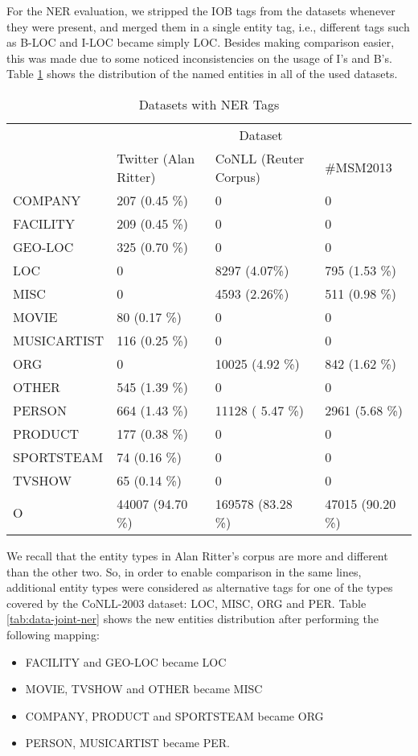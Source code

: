 For the NER evaluation, we stripped the IOB tags from the datasets whenever they were present, and merged them in a single entity tag, i.e., different tags such as B-LOC and I-LOC became simply LOC.
Besides making comparison easier, this was made due to some noticed inconsistencies on the usage of I's and B's.
Table \ref{tab:data-ner} shows the distribution of the named entities in all of the used datasets.
\begin{table}[H]
\centering
\footnotesize
\begin{tabular}{|l|l|l|l|}
\hline
\multirow{2}{*}{} & \multicolumn{3}{c|}{Dataset} \\ \cline{2-4} 
 & Twitter (Alan Ritter) & CoNLL (Reuter Corpus) & \#MSM2013 \\ \hline
COMPANY & 207 (0.45 \%) & 0 &  0 \\ \hline
FACILITY & 209 (0.45 \%) & 0 & 0 \\ \hline
GEO-LOC & 325 (0.70 \%)& 0 & 0 \\ \hline
LOC & 0 & 8297 (4.07\%) & 795 (1.53 \%) \\ \hline
MISC & 0 & 4593 (2.26\%) & 511 (0.98 \%)\\ \hline
MOVIE & 80 (0.17 \%) & 0 & 0 \\ \hline
MUSICARTIST & 116 (0.25 \%) & 0 & 0 \\ \hline
ORG & 0 & 10025 (4.92 \%) & 842 (1.62 \%)\\ \hline
OTHER& 545 (1.39 \%) & 0 & 0 \\ \hline
PERSON & 664 (1.43 \%)& 11128 ( 5.47 \%) & 2961 (5.68 \%)\\ \hline
PRODUCT & 177 (0.38 \%) & 0 & 0 \\ \hline
SPORTSTEAM & 74 (0.16 \%) & 0 & 0 \\ \hline
TVSHOW & 65 (0.14 \%) & 0 & 0 \\ \hline
O & 44007 (94.70 \%)& 169578 (83.28 \%) & 47015 (90.20 \%)\\ \hline
\end{tabular}
\caption[Datasets with NER Tags]{Datasets with NER Tags}
\label{tab:data-ner}
\end{table}

We recall that the entity types in Alan Ritter's corpus are more and different than the other two.
So, in order to enable comparison in the same lines, additional entity types were considered as alternative tags for one of the types covered by the CoNLL-2003 dataset: LOC, MISC, ORG and PER.
Table \ref{tab:data-joint-ner} shows the new entities distribution after performing the following mapping: 
\begin{itemize} 
\item FACILITY and  GEO-LOC became LOC
\item MOVIE, TVSHOW and OTHER became MISC
\item COMPANY, PRODUCT and SPORTSTEAM became ORG
\item PERSON, MUSICARTIST became PER. 
\end{itemize}


